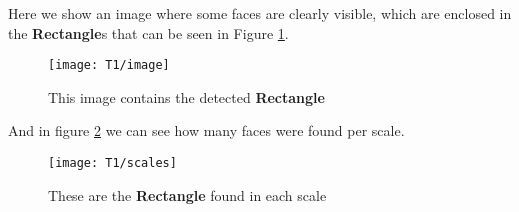 \noindent Here we show an image where some faces are clearly visible, which are enclosed in the \textbf{Rectangle}s that can be seen in Figure \ref{fig:image}.\\

\begin{figure}[h]
	\centering
	\texttt{[image: T1/image]}
	\caption{This image contains the detected \textbf{Rectangle}}
	\label{fig:image}
\end{figure}
\noindent And in figure \ref{fig:scale} we can see how many faces were found per scale.
\begin{figure}[h]
	\centering
	\texttt{[image: T1/scales]}
	\caption{These are the \textbf{Rectangle} found in each scale}
	\label{fig:scale}
\end{figure}